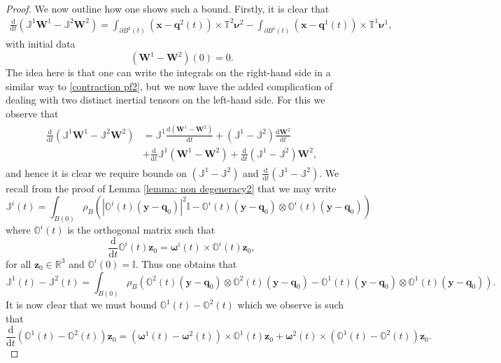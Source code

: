 \documentclass[a4paper]{amsart}
\numberwithin{equation}{section}
\theoremstyle{plain}
\newcommand{\mbf}[1]{\mathbf{#1}}
\newcommand{\mbb}[1]{\mathbb{#1}}
\begin{document}
\begin{proof}
We now outline how one shows such a bound.
Firstly, it is clear that
\begin{align}
    \frac{\mathrm{d}}{\mathrm{d}t}\left( \mbb{J}^1 \mbf{W}^1 - \mbb{J}^2 \mbf{W}^2 \right) = \int_{\partial B^2(t)} (\mbf{x} - \mbf{q}^2(t)) \times \mbb{T}^2 \boldsymbol{\nu}^2 - \int_{\partial B^1(t)} (\mbf{x} - \mbf{q}^1(t)) \times \mbb{T}^1 \boldsymbol{\nu}^1,
    \label{contraction pf9}
\end{align}
with initial data
\[ (\mbf{W}^1 - \mbf{W}^2)(0) = 0. \]
The idea here is that one can write the integrals on the right-hand side in a similar way to \eqref{contraction pf2}, but we now have the added complication of dealing with two distinct inertial tensors on the left-hand side.
For this we observe that
\begin{align}
\begin{aligned}
\frac{\mathrm{d}}{\mathrm{d}t}\left( \mbb{J}^1 \mbf{W}^1 - \mbb{J}^2 \mbf{W}^2 \right) &= \mbb{J}^1 \frac{\mathrm{d} (\mbf{W}^1 - \mbf{W}^2)}{\mathrm{d}t} + (\mbb{J}^1 - \mbb{J}^2) \frac{\mathrm{d} \mbf{W}^2}{\mathrm{d}t}\\
&+ \frac{\mathrm{d}}{\mathrm{d}t}\mbb{J}^1  (\mbf{W}^1 - \mbf{W}^2) + \frac{\mathrm{d}}{\mathrm{d}t}(\mbb{J}^1 - \mbb{J}^2) \mbf{W}^2,
\end{aligned}
\label{contraction pf10}
\end{align}
and hence it is clear we require bounds on $(\mbb{J}^1 - \mbb{J}^2)$ and $\frac{\mathrm{d}}{\mathrm{d}t}(\mbb{J}^1 - \mbb{J}^2)$.
We recall from the proof of Lemma \ref{lemma: non degeneracy2} that we may write
\[ \mbb{J}^i(t) =  \int_{B(0)} \rho_B \left(|\mbb{O}^i(t)(\mbf{y}-\mbf{q}_0)|^2 \mbb{I} - \mbb{O}^i(t)(\mbf{y}-\mbf{q}_0) \otimes \mbb{O}^i(t)(\mbf{y}-\mbf{q}_0)\right) \]
where $\mbb{O}^i(t)$ is the orthogonal matrix such that
\[\frac{\mathrm{d}}{\mathrm{d}t} \mbb{O}^i(t)\mbf{z}_0 = \boldsymbol{\omega}^i(t) \times \mbb{O}^i(t) \mbf{z}_0,\]
for all $\mbf{z}_0 \in \mbb{R}^3$ and $\mbb{O}^i(0) = \mbb{I}$.
Thus one obtains that
\[ \mbb{J}^1(t) - \mbb{J}^2(t) = \int_{B(0)} \rho_B \left(\mbb{O}^2(t)(\mbf{y}-\mbf{q}_0) \otimes \mbb{O}^2(t)(\mbf{y}-\mbf{q}_0) - \mbb{O}^1(t)(\mbf{y}-\mbf{q}_0) \otimes \mbb{O}^1(t)(\mbf{y}-\mbf{q}_0)\right).  \]
It is now clear that we must bound $\mbb{O}^1(t) - \mbb{O}^2(t)$ which we observe is such that
\[ \frac{\mathrm{d}}{\mathrm{d}t} (\mbb{O}^1(t) - \mbb{O}^2(t))\mbf{z}_0 = (\boldsymbol{\omega}^1(t) - \boldsymbol{\omega}^2(t)) \times \mbb{O}^1(t) \mbf{z}_0 + \boldsymbol{\omega}^2(t) \times (\mbb{O}^1(t) - \mbb{O}^2(t))\mbf{z}_0. \]

\end{proof}
\end{document}
